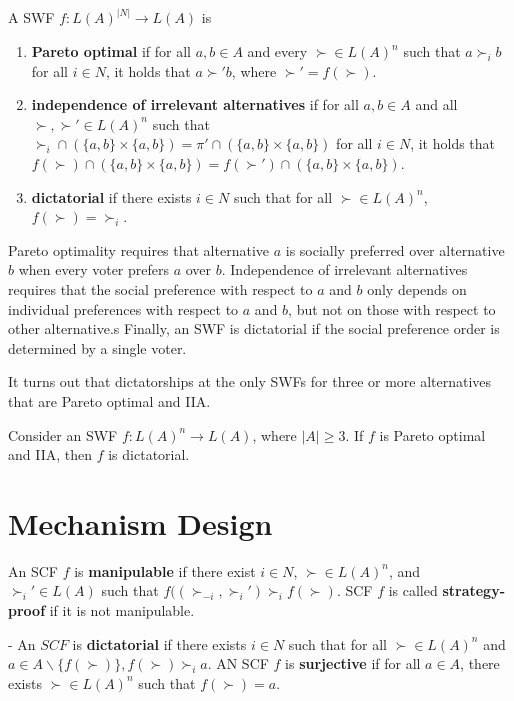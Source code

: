 \begin{defn}
  \label{sec:social-choice-4}
  A SWF $f: L(A)^{|N|} \rightarrow L(A)$ is
  \begin{enumerate}
  \item \textbf{Pareto optimal} if for all $a, b \in A$ and every
    $\succ \in L(A)^{n}$ such that $a \succ_{i} b$ for all $i \in N$,
    it holds that $a \succ' b$, where $\succ' = f(\succ)$.
  \item \textbf{independence of irrelevant alternatives} if for all
    $a, b \in A$ and all $\succ, \succ' \in L(A)^{n}$ such that
    $\succ_{i} \cap (\{ a, b \} \times \{ a, b \} ) = \pi' \cap (\{ a,
    b \} \times \{ a, b \}   )$ for all $i \in N$, it holds that
    $f(\succ) \cap ( \{ a, b \} \times \{ a, b \} ) = f(\succ') \cap (
    \{ a, b \}  \times \{ a, b \} )$.
  \item \textbf{dictatorial} if there exists $i \in N$ such that for
    all $\succ \in L(A)^{n}$, $f(\succ) = \succ_{i}$.
  \end{enumerate}

  Pareto optimality requires that alternative $a$ is socially
  preferred over alternative $b$ when every voter prefers $a$ over
  $b$.  Independence of irrelevant alternatives requires that the
  social preference with respect to $a$ and $b$ only depends on
  individual preferences with respect to $a$ and $b$, but not on those
  with respect to other alternative.s  Finally, an SWF is dictatorial
  if the social preference order is determined by a single voter.


\end{defn}

It turns out that dictatorships at the only SWFs for three or more
alternatives that are Pareto optimal and IIA.

\begin{thm}
  \label{sec:social-choice-5}
  Consider an SWF $f: L(A)^{n} \rightarrow L(A)$, where $|A| \geq 3$.
  If $f$ is Pareto optimal and IIA, then $f$ is dictatorial.
\end{thm}

\section{Mechanism Design}
\label{sec:mecahnism-design}

\begin{defn}
  \label{sec:mecahnism-design-1}
  An SCF $f$ is \textbf{manipulable} if there exist $i \in N$, $\succ
  \in L(A)^{n}$, and $\succ_{i}' \in L(A)$ such that $f((\succ_{-i},
  \succ_{i}') \succ_{i} f(\succ)$. 
  SCF $f$ is called
  \textbf{strategy-proof} if it is not manipulable.

-  An $SCF$ is \textbf{dictatorial} if there exists $i \in N$ such
  that for all $\succ \in L(A)^{n}$ and $a \in A \backslash \{
  f(\succ) \}, f(\succ) \succ_{i} a$.  AN SCF $f$ is
  \textbf{surjective} if for all $a \in A$, there exists $\succ \in
  L(A)^{n}$ such that $f(\succ) = a$.
\end{defn}

